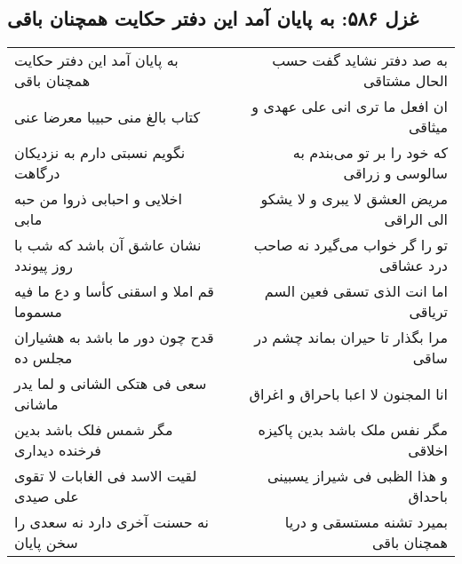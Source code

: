 \begin{center}
\section*{غزل ۵۸۶: به پایان آمد این دفتر حکایت همچنان باقی}
\label{sec:586}
\begin{longtable}{l p{0.5cm} r}
به پایان آمد این دفتر حکایت همچنان باقی
&&
به صد دفتر نشاید گفت حسب الحال مشتاقی
\\
کتاب بالغ منی حبیبا معرضا عنی
&&
ان افعل ما تری انی علی عهدی و میثاقی
\\
نگویم نسبتی دارم به نزدیکان درگاهت
&&
که خود را بر تو می‌بندم به سالوسی و زراقی
\\
اخلایی و احبابی ذروا من حبه مابی
&&
مریض العشق لا یبری و لا یشکو الی الراقی
\\
نشان عاشق آن باشد که شب با روز پیوندد
&&
تو را گر خواب می‌گیرد نه صاحب درد عشاقی
\\
قم املا و اسقنی کأسا و دع ما فیه مسموما
&&
اما انت الذی تسقی فعین السم تریاقی
\\
قدح چون دور ما باشد به هشیاران مجلس ده
&&
مرا بگذار تا حیران بماند چشم در ساقی
\\
سعی فی هتکی الشانی و لما یدر ماشانی
&&
انا المجنون لا اعبا باحراق و اغراق
\\
مگر شمس فلک باشد بدین فرخنده دیداری
&&
مگر نفس ملک باشد بدین پاکیزه اخلاقی
\\
لقیت الاسد فی الغابات لا تقوی علی صیدی
&&
و هذا الظبی فی شیراز یسبینی باحداق
\\
نه حسنت آخری دارد نه سعدی را سخن پایان
&&
بمیرد تشنه مستسقی و دریا همچنان باقی
\\
\end{longtable}
\end{center}
